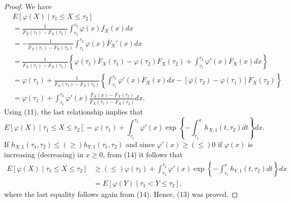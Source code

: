 \documentclass[11pt]{article}
\begin{document}
\begin{proof}
	We have
	{\small \begin{align*}
			& \textstyle E[\varphi(X) \mid \tau_1 \leq X \leq \tau_2] \\
			& = \textstyle \frac{1}{\overline{F}_X(\tau_1) - \overline{F}_X(\tau_2)} \int_{\tau_1}^{\tau_2} \varphi(x) f_X(x) dx \\
			& = \textstyle-\frac{1}{\overline{F}_X(\tau_1) - \overline{F}_X(\tau_2)} \int_{\tau_1}^{\tau_2} \varphi(x) \overline{F}_X'(x) dx \\
			& = \textstyle \frac{1}{\overline{F}_X(\tau_1) - \overline{F}_X(\tau_2)} \left\{ \varphi(\tau_1)\overline{F}_X(\tau_1) - \varphi(\tau_2)\overline{F}_X(\tau_2) + \int_{\tau_1}^{\tau_2} \varphi'(x)\overline{F}_X(x) dx \right\} \\
			& = \textstyle \varphi(\tau_1) + \frac{1}{\overline{F}_X(\tau_1) - \overline{F}_X(\tau_2)} \left\{ \int_{\tau_1}^{\tau_2} \varphi'(x)\overline{F}_X(x) dx - [\varphi(\tau_2) - \varphi(\tau_1)]\overline{F}_X(\tau_2) \right\} \\
			& = \textstyle \varphi(\tau_1) + \int_{\tau_1}^{\tau_2} \varphi'(x) \frac{\overline{F}_X(x) - \overline{F}_X(\tau_2)}{\overline{F}_X(\tau_1) - \overline{F}_X(\tau_2)} dx.
	\end{align*}}
	Using (11), the last relationship implies that
	\begin{equation}
		\textstyle E[\varphi(X) \mid \tau_1 \leq X \leq \tau_2] = \varphi(\tau_1) + \int_{\tau_1}^{\tau_2} \varphi'(x) \exp\left\{-\int_{\tau_1}^x h_{X,1}(t,\tau_2) dt \right\} dx.
	\end{equation}
	If $ \textstyle h_{X,1}(\tau_1,\tau_2)\leq (\geq) h_{Y,1}(\tau_1,\tau_2)$ and since $ \textstyle \varphi'(x)\geq (\leq) 0$ if $\varphi(x)$ is increasing (decreasing) in $x\geq 0$, from (14) it follows that
	\begin{align*}
		E[\varphi(X) \mid \tau_1 \leq X \leq \tau_2] & \textstyle \geq (\leq) \varphi(\tau_1) + \int_{\tau_1}^{\tau_2} \varphi'(x) \exp\left\{-\int_{\tau_1}^x h_{Y,1}(t,\tau_2) dt \right\} dx \\
		& = \textstyle E[\varphi(Y) \mid \tau_1 < Y \leq \tau_2],
	\end{align*}
	where the last equality follows again from (14). Hence, (13) was proved.
\end{proof}
\end{document}
